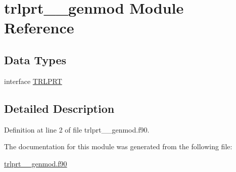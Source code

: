 \hypertarget{classtrlprt____genmod}{\section{trlprt\+\_\+\+\_\+genmod Module Reference}
\label{classtrlprt____genmod}
}
\subsection*{Data Types}
\begin{DoxyCompactItemize}
\item 
interface \hyperlink{interfacetrlprt____genmod_1_1TRLPRT}{T\+R\+L\+P\+R\+T}
\end{DoxyCompactItemize}


\subsection{Detailed Description}


Definition at line 2 of file trlprt\+\_\+\+\_\+genmod.\+f90.



The documentation for this module was generated from the following file\+:\begin{DoxyCompactItemize}
\item 
\hyperlink{trlprt____genmod_8f90}{trlprt\+\_\+\+\_\+genmod.\+f90}\end{DoxyCompactItemize}

